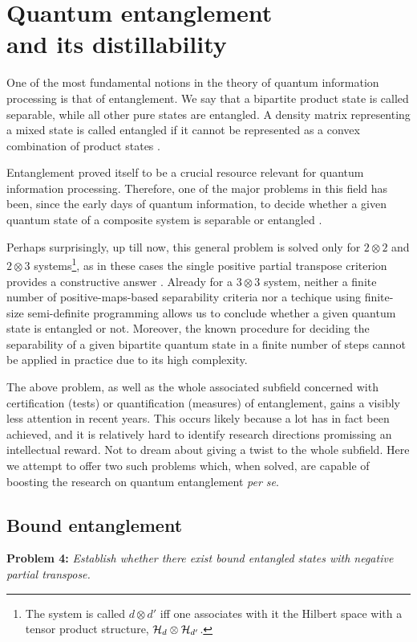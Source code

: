 \documentclass[english,aps,pra,nofootinbib,twocolumn,superscriptaddress]{revtex4-1}
\newcommand{\1}{{\rm 1\hspace{-0.9mm}l}}
\begin{document}
\section{Quantum entanglement \\ and its  distillability}

One of the most fundamental notions in the 
   theory of quantum information processing is that of entanglement. We say that a bipartite product state is called separable, 
 while all other pure states are entangled.
 A density matrix representing a mixed state is called  entangled
  if it cannot be represented as a convex combination of product states  \cite{Werner1989}.
  
  Entanglement proved itself to be a crucial resource relevant for quantum information processing.
 Therefore, one of the major problems in this field has been, since the early days of quantum information, to decide
 whether a given quantum state of a composite
system is separable or entangled \cite{HHHH09}.

Perhaps surprisingly, up till now,
 this general problem is solved only for $2 \otimes 2$ and $2 \otimes 3$ systems\footnote{The system is called $d \otimes d'$ 
 	iff one associates with it the Hilbert space with a tensor product structure, 
 	 ${\cal H}_d \otimes  {\cal H}_{d'}$.},
as in these cases  the single positive partial transpose  criterion provides a 
constructive answer \cite{HHH96}.
Already for a $3 \otimes 3$ system, neither 
a finite number of positive-maps-based separability criteria  \cite{Sk16} 
nor a techique using finite-size semi-definite programming \cite{Fa19} allows us to conclude whether a given quantum state is entangled or not.
 Moreover, the known procedure for deciding the separability 
 of a given bipartite quantum state in a finite number of steps  \cite{BHHA13} 
cannot be applied in practice due to its high complexity. 
 
The above problem, as well as the whole associated subfield concerned with certification (tests) or quantification (measures) of entanglement, gains a visibly less attention in recent years. This occurs likely because a lot has in fact been achieved, and it is relatively hard to identify research directions promissing an intellectual reward. Not to dream about giving a twist  to the whole subfield. Here we attempt to offer two such problems which, when solved, are capable of boosting the research on quantum entanglement \textit{per se}. 
 
\subsection{Bound entanglement}
{\bf Problem 4:} {\sl  Establish whether there
exist  bound entangled states with negative partial transpose.}                            
\medskip
\end{document}
